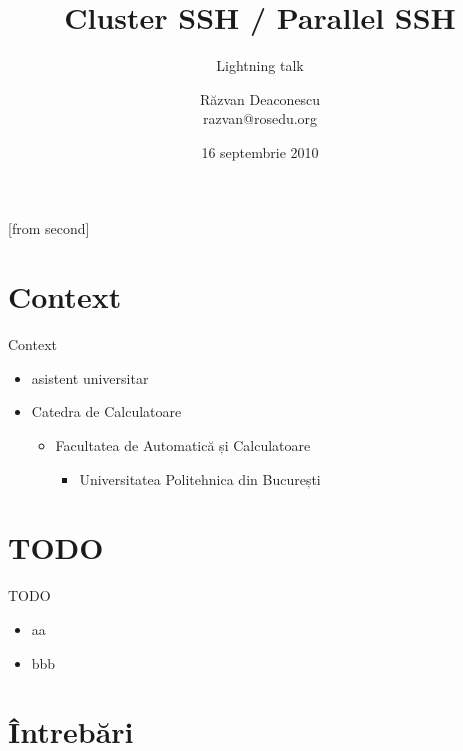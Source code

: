 \documentclass{beamer}
\title[Cluster SSH / Parallel SSH]{Cluster SSH / Parallel SSH}
\subtitle{Lightning talk}
\institute{Întâlnirile lunare RLUG -- Septembrie 2010}
\author[Răzvan Deaconescu]{Răzvan Deaconescu\\
	razvan@rosedu.org}
\date{16 septembrie 2010}
\begin{document}
[from second]


\frame{\titlepage}

\section{Context}

\begin{frame}{Context}
	\begin{itemize}		%
		\item asistent universitar
		\item Catedra de Calculatoare
			\begin{itemize}
				\item Facultatea de Automatică și Calculatoare
					\begin{itemize}
						\item Universitatea Politehnica din București
					\end{itemize}
			\end{itemize}
	\end{itemize}
\end{frame}

\frame{\tableofcontents}

\section{TODO}

\frame{\tableofcontents[currentsection]}

\begin{frame}{TODO}
	\begin{itemize}
		\item aa
		\item bbb
	\end{itemize}
\end{frame}

\section{Întrebări}

\frame{\tableofcontents[currentsection]}
\end{document}

